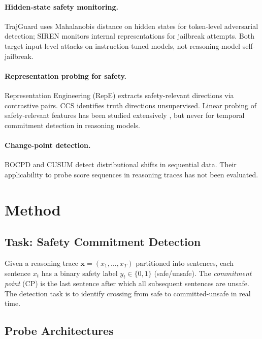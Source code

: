 \documentclass[11pt,a4paper]{article}
\begin{document}
\paragraph{Hidden-state safety monitoring.}
TrajGuard \cite{zhang2025trajguard} uses Mahalanobis distance on hidden states for token-level adversarial detection; SIREN \cite{peng2025siren} monitors internal representations for jailbreak attempts.
Both target input-level attacks on instruction-tuned models, not reasoning-model self-jailbreak.

\paragraph{Representation probing for safety.}
Representation Engineering (RepE) \cite{zou2023repE} extracts safety-relevant directions via contrastive pairs.
CCS \cite{burns2023ccs} identifies truth directions unsupervised.
Linear probing of safety-relevant features has been studied extensively \cite{li2024probing}, but never for temporal commitment detection in reasoning models.

\paragraph{Change-point detection.}
BOCPD \cite{adams2007bocpd} and CUSUM detect distributional shifts in sequential data.
Their applicability to probe score sequences in reasoning traces has not been evaluated.

\section{Method}
\label{sec:method}

\subsection{Task: Safety Commitment Detection}

Given a reasoning trace $\mathbf{x} = (x_1, \ldots, x_T)$ partitioned into sentences, each sentence $x_t$ has a binary safety label $y_t \in \{0, 1\}$ (safe/unsafe).
The \emph{commitment point} (CP) is the last sentence after which all subsequent sentences are unsafe.
The detection task is to identify crossing from safe to committed-unsafe in real time.

\subsection{Probe Architectures}
\end{document}
